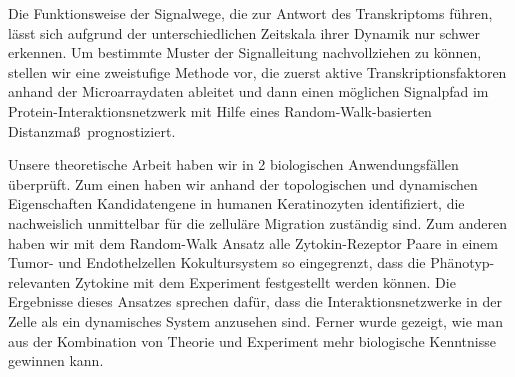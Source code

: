 Die Funktionsweise der Signalwege, die zur Antwort des
Transkriptoms f\"uhren, l\"asst sich aufgrund der 
unterschiedlichen
Zeitskala ihrer Dynamik nur schwer erkennen. Um bestimmte
Muster der Signalleitung nachvollziehen zu k\"onnen, stellen
wir eine zweistufige Methode vor, die zuerst aktive
Transkriptionsfaktoren anhand der Microarraydaten ableitet und
dann einen m\"oglichen Signalpfad im 
Protein-Interaktionsnetzwerk mit Hilfe eines 
Random-Walk-basierten Distanzma\ss \ prognostiziert.

Unsere theoretische Arbeit haben wir in 2 biologischen 
Anwendungsf\"allen \"uberpr\"uft. Zum einen haben wir
anhand der topologischen und dynamischen Eigenschaften
Kandidatengene in humanen Keratinozyten 
identifiziert, die nachweislich unmittelbar f\"ur die
zellul\"are Migration zust\"andig sind. Zum anderen
haben wir mit dem Random-Walk Ansatz 
alle Zytokin-Rezeptor Paare in einem Tumor-
und Endothelzellen Kokultursystem so eingegrenzt,
dass die Ph\"anotyp-relevanten Zytokine mit dem Experiment
festgestellt werden k\"onnen. Die Ergebnisse dieses Ansatzes 
sprechen daf\"ur, dass
die Interaktionsnetzwerke in der Zelle als ein dynamisches
System anzusehen sind. Ferner wurde gezeigt, wie man
aus der Kombination von Theorie und Experiment mehr 
biologische Kenntnisse gewinnen kann.
